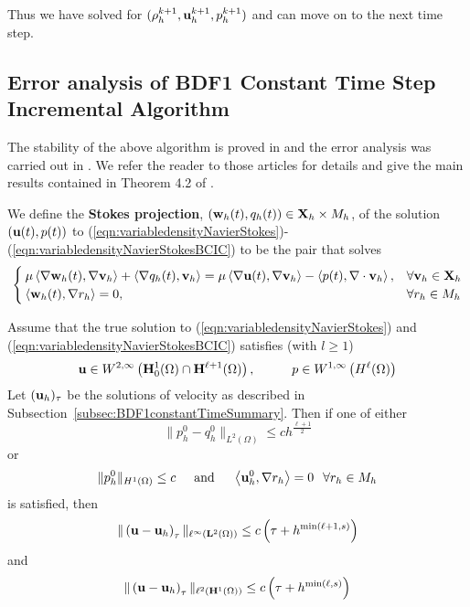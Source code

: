 \documentclass[letterpaper]{erdc}
\begin{document}
Thus we have solved for $(\rho_h^{k+1}, \textbf{u}_h^{k+1}, p_h^{k+1})$ and can move on to the next time step.


\subsection{Error analysis of BDF1 Constant Time Step Incremental Algorithm}
The stability of the above algorithm is proved in \cite{guermond2009splitting} and the error analysis was carried out in \cite{guermond2011error}.  We refer the reader to those articles for details and give the main results contained in Theorem 4.2 of \cite{guermond2011error}.

We define the \textbf{Stokes projection}, $\left(\textbf{w}_h(t),q_h(t)\right) \in \textbf{X}_h\times M_h$, of the solution $\left(\textbf{u}(t),p(t)\right)$ to (\ref{eqn:variabledensityNavierStokes})-(\ref{eqn:variabledensityNavierStokesBCIC}) to be the pair that solves
\begin{equation}
  \begin{cases}
    \mu\left\langle \nabla\textbf{w}_h(t), \nabla\textbf{v}_h \right\rangle + \left\langle \nabla q_h(t), \textbf{v}_h \right\rangle = \mu\left\langle \nabla \textbf{u}(t), \nabla\textbf{v}_h \right\rangle - \left\langle p(t), \nabla\cdot\textbf{v}_h \right\rangle, & \forall \textbf{v}_h \in \textbf{X}_h\\
    \left\langle \textbf{w}_h(t), \nabla r_h \right\rangle = 0, & \forall r_h\in M_h
  \end{cases}
\end{equation}

\begin{theorem}
  Assume that the true solution to (\ref{eqn:variabledensityNavierStokes}) and (\ref{eqn:variabledensityNavierStokesBCIC}) satisfies (with $l\geq 1$)
  \begin{equation}
    \textbf{u}\in W^{2,\infty}\left(\mathbf{H}_0^1(\Omega)\cap \mathbf{H}^{\ell+1}(\Omega)\right), \hspace{1cm} p\in W^{1,\infty}\left(H^{\ell}(\Omega) \right)
  \end{equation}
  Let $(\textbf{u}_h)_{\tau}$ be the solutions of velocity as described in Subsection~\ref{subsec:BDF1constantTimeSummary}.  Then if one of either
  \begin{equation}
    \|p_h^0 - q_h^0 \|_{L^2(\Omega)} \leq c h^{\frac{\ell+1}{2}}
  \end{equation}
  or
  \begin{equation}
    \|p_h^0\|_{H^1(\Omega)} \leq c \hspace{0.5cm} \mbox{and} \hspace{0.5cm} \left\langle \textbf{u}_h^0, \nabla r_h \right\rangle = 0 \hspace{0.25cm} \forall r_h\in M_h
  \end{equation}
  is satisfied, then
  \begin{equation}
    \|\left(\textbf{u} - \textbf{u}_h\right)_{\tau} \|_{\ell^{\infty}(\mathbf{L}^2(\Omega))} \leq c\left( \tau + h^{\min(\ell+1,s)} \right)
  \end{equation}
  and
  \begin{equation}
    \|\left(\textbf{u} - \textbf{u}_h\right)_{\tau} \|_{\ell^{2}(\mathbf{H}^1(\Omega))} \leq c\left( \tau + h^{\min(\ell,s)} \right)
  \end{equation}
\end{theorem}
\end{document}
